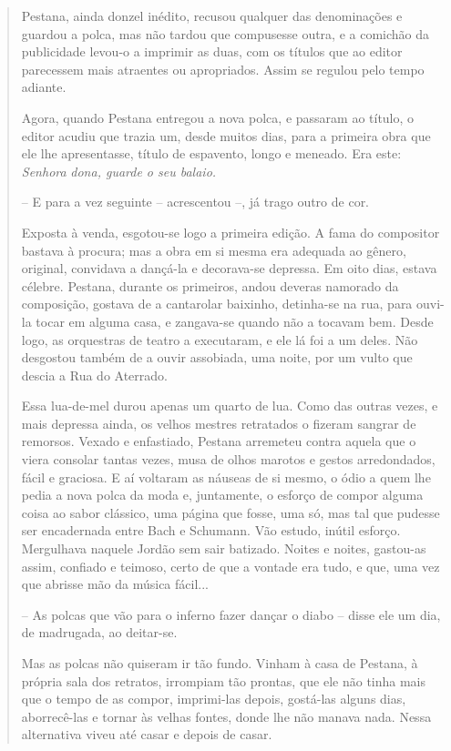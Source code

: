\begin{quote}
Pestana, ainda donzel inédito, recusou qualquer das denominações e
guardou a polca, mas não tardou que compusesse outra, e a comichão da
publicidade levou-o a imprimir as duas, com os títulos que ao editor
parecessem mais atraentes ou apropriados. Assim se regulou pelo tempo
adiante.

Agora, quando Pestana entregou a nova polca, e passaram ao título, o
editor acudiu que trazia um, desde muitos dias, para a primeira obra que
ele lhe apresentasse, título de espavento, longo e meneado. Era este:
\emph{Senhora} \emph{dona, guarde o seu balaio.}

-- E para a vez seguinte -- acrescentou --, já trago outro de cor.

Exposta à venda, esgotou-se logo a primeira edição. A fama do compositor
bastava à procura; mas a obra em si mesma era adequada ao gênero,
original, convidava a dançá-la e decorava-se depressa. Em oito dias,
estava célebre. Pestana, durante os primeiros, andou deveras namorado da
composição, gostava de a cantarolar baixinho, detinha-se na rua, para
ouvi-la tocar em alguma casa, e zangava-se quando não a tocavam bem.
Desde logo, as orquestras de teatro a executaram, e ele lá foi a um
deles. Não desgostou também de a ouvir assobiada, uma noite, por um
vulto que descia a Rua do Aterrado.

Essa lua-de-mel durou apenas um quarto de lua. Como das outras vezes, e
mais depressa ainda, os velhos mestres retratados o fizeram sangrar de
remorsos. Vexado e enfastiado, Pestana arremeteu contra aquela que o
viera consolar tantas vezes, musa de olhos marotos e gestos
arredondados, fácil e graciosa. E aí voltaram as náuseas de si mesmo, o
ódio a quem lhe pedia a nova polca da moda e, juntamente, o esforço de
compor alguma coisa ao sabor clássico, uma página que fosse, uma só, mas
tal que pudesse ser encadernada entre Bach e Schumann. Vão estudo,
inútil esforço. Mergulhava naquele Jordão sem sair batizado. Noites e
noites, gastou-as assim, confiado e teimoso, certo de que a vontade era
tudo, e que, uma vez que abrisse mão da música fácil...

-- As polcas que vão para o inferno fazer dançar o diabo -- disse ele um
dia, de madrugada, ao deitar-se.

Mas as polcas não quiseram ir tão fundo. Vinham à casa de Pestana, à
própria sala dos retratos, irrompiam tão prontas, que ele não tinha mais
que o tempo de as compor, imprimi-las depois, gostá-las alguns dias,
aborrecê-las e tornar às velhas fontes, donde lhe não manava nada. Nessa
alternativa viveu até casar e depois de casar.


\end{quote}
